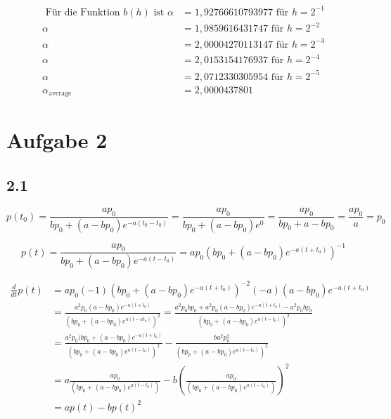 \documentclass[10pt,oneside,a4paper]{scrartcl}
\begin{document}
    \begin{align*}
 		\text{ Für die Funktion } b(h) \text { ist } \alpha &= 1,92766610793977 \text { für } h = 2^{-1} \\
		\alpha &= 1,9859616431747 \text { für } h = 2^{-2} \\
		\alpha &= 2,00004270113147 \text { für } h = 2^{-3} \\
		\alpha &= 2,0153154176937 \text { für } h = 2^{-4} \\
		\alpha &= 2,0712330305954 \text { für } h = 2^{-5} \\
		\alpha_{\text{average}} &= 2,0000437801
    \end{align*}

	\section*{Aufgabe 2}

	\subsection*{2.1}

	\begin{equation*}	
		p(t_{0}) =\frac {ap_0} {bp_0+ (a-bp_0)e^{-a(t_{0}-t_0)} } = 
				\frac {ap_0} {bp_0+ (a-bp_0)e^0 } = 
				\frac {ap_0} {bp_0+ a-bp_0} =
				\frac {ap_0} {a } = p_0 
	\end{equation*}

	\begin{equation*}
		p(t)  =\frac {ap_0} {bp_0+ (a-bp_0)e^{-a(t-t_0)} } =
			 ap_{0} (bp_0+ (a-bp_0)e^{-a(t + t_0) })^{-1} 
	\end{equation*}

	\begin{align*}
		\frac{d}{dt}p(t) & =
			 ap_{0}(-1) (bp_0+( a -bp_0)e^{-a(t + t_0) })^{-2}
			 (- a)(a-bp_0)e^{-a(t + t_0) }\\
			 & =\frac {a^{2}p_0(a-bp_0)e^{-a(t + t_0)}} {(bp_0+( a -bp_0)e^{a(t 				- at_0) })^{2}}
			 =\frac {a^{2}p_0bp_0 + a^{2}p_0(a-bp_0)e^{-a(t + t_0)} - 		 			a^{2}p_0bp_0} {(bp_0+( a -bp_0)e^{a(t- t_0) })^{2}}\\
			& = \frac {a^{2}p_0(bp_0 + (a-bp_0)e^{-a(t + t_0)}}
			 {(bp_0+( a -bp_0)e^{a(t- t_0) })^{2}} - 
				\frac {ba^{2}p_{0}^2} {(bp_0+( a -bp_0)e^{a(t- t_0) })^{2}}\\
			& =a \frac {ap_0} {(bp_0+( a -bp_0)e^{a(t- t_0) })} - 
				b\left(\frac {ap_{0}} {(bp_0+( a -bp_0)e^{a(t- t_0) })}\right)^2\\
			& = ap(t)-bp(t)^2
	\end{align*}
\end{document}
